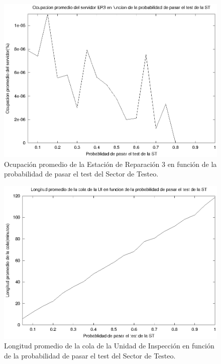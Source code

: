 \documentclass[a4paper,10pt]{article}
\begin{document}
\begin{figure}[ht]
\begin{center}
\includegraphics[width=15cm]{./img/ss_ER3.eps}
\caption{\label{fig:ss_ER3} Ocupaci\'on promedio de la Estaci\'on de Reparaci\'on 3 en funci\'on de la probabilidad de pasar el test del Sector de Testeo.}
\end{center}
\end{figure}

\begin{figure}[ht]
\begin{center}
\includegraphics[width=15cm]{./img/ql_UI.eps}
\caption{\label{fig:ql_UI} Longitud promedio de la cola de la Unidad de Inspecci\'on en funci\'on de la probabilidad de pasar el test del Sector de Testeo.}
\end{center}
\end{figure}
\end{document}
